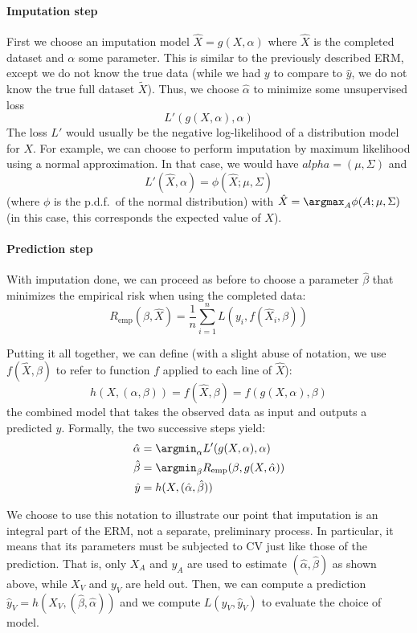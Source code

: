 			\paragraph{Imputation step}
First we choose an imputation model $\hat{X} = g(X, \alpha)$ where $\hat{X}$ is the completed dataset and $\alpha$ some parameter. This is similar to the previously described ERM, except we do not know the true data (while we had $y$ to compare to $\hat{y}$, we do not know the true full dataset $\tilde{X}$). Thus, we choose $\hat{\alpha}$ to minimize some unsupervised loss
$$L'(g(X, \alpha), \alpha)$$
The loss $L'$ would usually be the negative log-likelihood of a distribution model for $X$. For example, we can choose to perform imputation by maximum likelihood using a normal approximation. In that case, we would have $alpha =(\mu, \Sigma)$ and \cite{ref_amelia}
$$L'(\hat{X}, \alpha) = \phi(\hat{X};\mu, \Sigma) $$ (where $\phi$ is the p.d.f.\ of the normal distribution)
with $\hat{X} = \argmax_{A} \phi(A;\mu, \Sigma)$ (in this case, this corresponds the expected value of $X$).

			\paragraph{Prediction step}
With imputation done, we can proceed as before to choose a parameter $\hat{\beta}$ that minimizes the empirical risk when using the completed data:
	$$ R_{\text{emp}}(\beta, \hat{X}) = \frac{1}{n} \sum\limits_{i=1}^n L(y_i, f(\hat{X}_i, \beta))$$
	
Putting it all together, we can define (with a slight abuse of notation, we use $f(\hat{X}, \beta)$ to refer to function $f$ applied to each line of $\hat{X}$):
$$ h(X, (\alpha, \beta)) = f(\hat{X}, \beta) = f( g(X, \alpha), \beta) $$
the combined model that takes the observed data as input and outputs a predicted $y$. Formally, the two successive steps yield:
\begin{align*}
\hat{\alpha} &= \argmin_{\alpha} L'(g(X,\alpha), \alpha) \\
\hat{\beta} &= \argmin_{\beta} R_{\text{emp}}(\beta,g(X,\hat{\alpha})) \\
\hat{y} &= h(X, (\hat{\alpha}, \hat{\beta}))
\end{align*}

We choose to use this notation to illustrate our point that imputation is an integral part of the ERM, not a separate, preliminary process. In particular, it means that its parameters must be subjected to CV just like those of the prediction. That is, only $X_A$ and $y_A$ are used to estimate $(\hat{\alpha}, \hat{\beta})$ as shown above, while $X_V$ and $y_V$ are held out. Then, we can compute a prediction $\hat{y}_V = h(X_V, (\hat{\beta}, \hat{\alpha}))$ and we compute $L(y_V, \hat{y}_V)$ to evaluate the choice of model.

